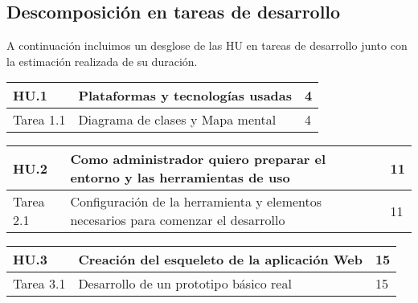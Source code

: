 \newpage

\subsection{Descomposición en tareas de desarrollo}

A continuación incluimos un desglose de las HU en tareas de desarrollo junto con la estimación realizada de su duración.\\

\begin{table}[h]
	\centering
	\begin{tabular}{| p{2.3cm} | p{6.7cm} | p{2cm} |}
		\rowcolor[HTML]{329A9D} 
		{\color[HTML]{FFFFFF} \textbf{HU.1}} & {\color[HTML]{FFFFFF} \textbf{Plataformas y tecnologías usadas}} & {\color[HTML]{FFFFFF} \textbf{4}}  \\ \hline
		Tarea 1.1 & Diagrama de clases y Mapa mental & 4 \\ \hline
	\end{tabular}
\end{table}

\begin{table}[h]
	\centering
	\begin{tabular}{| p{2.3cm} | p{6.7cm} | p{2cm} |}
		\rowcolor[HTML]{329A9D} 
		{\color[HTML]{FFFFFF} \textbf{HU.2}} & {\color[HTML]{FFFFFF} \textbf{Como administrador quiero preparar el entorno y las herramientas de uso}} & {\color[HTML]{FFFFFF} \textbf{11}}  \\ \hline
		Tarea 2.1 & Configuración de la herramienta y elementos necesarios para comenzar el desarrollo & 11 \\ \hline
	\end{tabular}
\end{table}

\begin{table}[h]
	\centering
	\begin{tabular}{| p{2.3cm} | p{6.7cm} | p{2cm} |}
		\rowcolor[HTML]{329A9D} 
		{\color[HTML]{FFFFFF} \textbf{HU.3}} & {\color[HTML]{FFFFFF} \textbf{Creación del esqueleto de la aplicación Web}} & {\color[HTML]{FFFFFF} \textbf{15}}  \\ \hline
		Tarea 3.1 & Desarrollo de un prototipo básico real & 15 \\ \hline
	\end{tabular}
\end{table}

